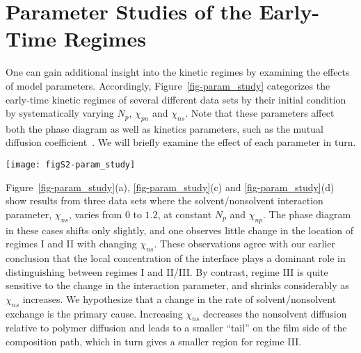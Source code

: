 \documentclass[journal=mamobx,manuscript=suppinfo]{achemso}
\begin{document}
\section{Parameter Studies of the Early-Time Regimes}
One can gain additional insight into the kinetic regimes by examining the effects of model parameters.
Accordingly, Figure~\ref{fig-param_study} categorizes the early-time kinetic regimes of several different data sets by their initial condition by systematically varying $N_{p}$, $\chi_{pn}$ and $\chi_{ns}$.
Note that these parameters affect both the phase diagram as well as kinetics parameters, such as the mutual diffusion coefficient~\cite{Tree2017}.
We will briefly examine the effect of each parameter in turn.

\begin{figure*}[tbp]
  \texttt{[image: figS2-param\_study]}
  \caption{Characterization of the early-time kinetic regime by initial condition for the seven different sets of parameters labeled in the figure.
Note that: panel (d) is the base case, $\chi_{ns}$ varies in the upper left panels (a, c, d), $N_{p}$ varies in the upper right panels (b, d, e) and $\chi_{pn}$ varies in the bottom panels (d, f, g).
Conditions which lead to regime I (no phase separation) appear as red dots, regime II (phase separation) appear as green dots and regime III (immediate spinodal decomposition) appear as blue dots.}
  \label{fig-param_study}
\end{figure*}

Figure~\ref{fig-param_study}(a), \ref{fig-param_study}(c) and \ref{fig-param_study}(d) show results from three data sets where the solvent/nonsolvent interaction parameter, $\chi_{ns}$, varies from 0 to $1.2$, at constant $N_{p}$ and $\chi_{np}$.
The phase diagram in these cases shifts only slightly, and one observes little change in the location of regimes I and II with changing $\chi_{ns}$.
These observations agree with our earlier conclusion that the local concentration of the interface plays a dominant role in distinguishing between regimes I and II/III.
By contrast, regime III is quite sensitive to the change in the interaction parameter, and shrinks considerably as $\chi_{ns}$ increases.
We hypothesize that a change in the rate of solvent/nonsolvent exchange is the primary cause. 
Increasing $\chi_{ns}$ decreases the nonsolvent diffusion relative to polymer diffusion and leads to a smaller ``tail'' on the film side of the composition path, which in turn gives a smaller region for regime III.
\end{document}
